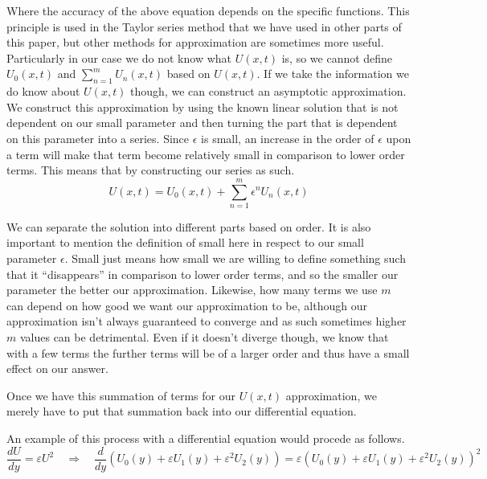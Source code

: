 \documentclass{article}
\begin{document}
\par Where the accuracy of the above equation depends on the specific functions. This principle is used in the Taylor series method that we have used in other parts of this paper, but other methods for approximation are sometimes more useful. Particularly in our case we do not know what $U(x,t)$ is, so we cannot define $U_0(x,t)$ and $\sum_{n=1}^{m} U_n(x,t)$ based on $U(x,t)$. If we take the information we do know about $U(x,t)$ though, we can construct an asymptotic approximation. We construct this approximation by using the known linear solution that is not dependent on our small parameter and then turning the part that is dependent on this parameter into a series. Since $\epsilon$ is small, an increase in the order of $\epsilon$ upon a term will make that term become relatively small in comparison to lower order terms. This means that by constructing our series as such.
\begin{equation}
    U(x,t) = U_0(x,t) + \sum_{n=1}^{m} \epsilon^nU_n(x,t)
    \label{eq:example_label}
\end{equation}
\par We can separate the solution into different parts based on order. It is also important to mention the definition of small here in respect to our small parameter $\epsilon$. Small just means how small we are willing to define something such that it “disappears” in comparison to lower order terms, and so the smaller our parameter the better our approximation. Likewise, how many terms we use $m$ can depend on how good we want our approximation to be, although our approximation isn’t always guaranteed to converge and as such sometimes higher $m$ values can be detrimental. Even if it doesn’t diverge though, we know that with a few terms the further terms will be of a larger order and thus have a small effect on our answer.
\par Once we have this summation of terms for our $U(x,t)$ approximation, we merely have to put that summation back into our differential equation.
\par An example of this process with a differential equation would procede as follows.
\begin{equation}
    \frac{dU}{dy} = \varepsilon U^2 
    \quad \Rightarrow \quad
    \frac{d}{dy}(U_0(y) + \varepsilon U_1(y) + \varepsilon^2 U_2(y)) = \varepsilon (U_0(y) + \varepsilon U_1(y) + \varepsilon^2 U_2(y))^2
    \label{eq:original_expansion}
\end{equation}
\end{document}
